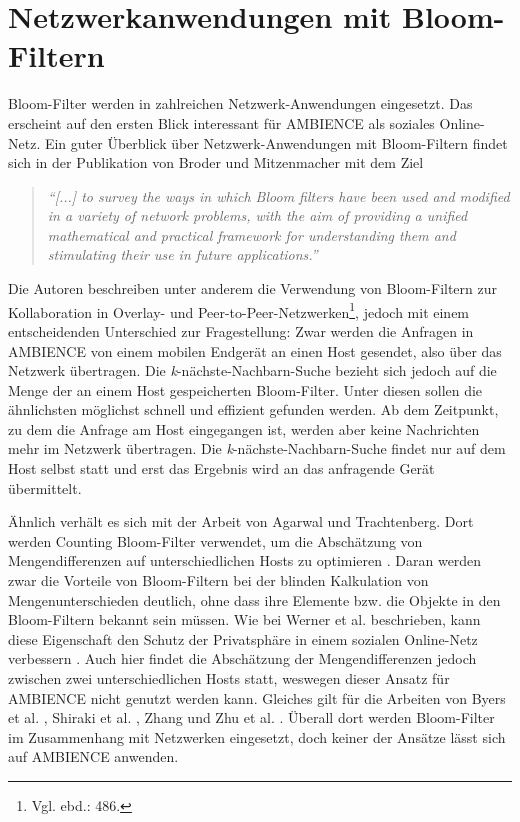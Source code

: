 \section{Netzwerkanwendungen mit Bloom-Filtern}\label{sec:bloom-netzwerk}
Bloom-Filter werden in zahlreichen Netzwerk-Anwendungen eingesetzt. Das erscheint auf den ersten Blick interessant für AMBIENCE als soziales Online-Netz. Ein guter Überblick über Netzwerk-Anwendungen mit Bloom-Filtern findet sich in der Publikation von Broder und Mitzenmacher mit dem Ziel 
\begin{quote}
\textit{"`[...] to survey the ways in which Bloom filters have been used and modified in a variety of network problems, with the aim of providing a unified mathematical and practical framework for understanding them and stimulating their use in future applications."'} \cite{Broder2004}
\end{quote}
Die Autoren beschreiben unter anderem die Verwendung von Bloom-Filtern zur Kollaboration in Overlay- und Peer-to-Peer-Netzwerken\footnote{Vgl. ebd.: 486.}, jedoch mit einem entscheidenden Unterschied zur Fragestellung: Zwar werden die Anfragen in AMBIENCE von einem mobilen Endgerät an einen Host gesendet, also über das Netzwerk übertragen. Die \textit{k}-nächste-Nachbarn-Suche bezieht sich jedoch auf die Menge der an einem Host gespeicherten Bloom-Filter. Unter diesen sollen die ähnlichsten möglichst schnell und effizient gefunden werden. Ab dem Zeitpunkt, zu dem die Anfrage am Host eingegangen ist, werden aber keine Nachrichten mehr im Netzwerk übertragen. Die \textit{k}-nächste-Nachbarn-Suche findet nur auf dem Host selbst statt und erst das Ergebnis wird an das anfragende Gerät übermittelt. 

Ähnlich verhält es sich mit der Arbeit von Agarwal und Trachtenberg. Dort werden Counting Bloom-Filter verwendet, um die Abschätzung von Mengendifferenzen auf unterschiedlichen Hosts zu optimieren \cite{Agarwal2006}. Daran werden zwar die Vorteile von Bloom-Filtern bei der blinden Kalkulation von Mengenunterschieden deutlich, ohne dass ihre Elemente bzw. die Objekte in den Bloom-Filtern bekannt sein müssen. Wie bei Werner et al. beschrieben, kann diese Eigenschaft den Schutz der Privatsphäre in einem sozialen Online-Netz verbessern \cite{Werner2015}. Auch hier findet die Abschätzung der Mengendifferenzen jedoch zwischen zwei unterschiedlichen Hosts statt, weswegen dieser Ansatz für AMBIENCE nicht genutzt werden kann. Gleiches gilt für die Arbeiten von Byers et al. \cite{Byers2002}, Shiraki et al. \cite{Shiraki2009}, Zhang \cite{Zhang2012} und Zhu et al. \cite{Zhu2004}. Überall dort werden Bloom-Filter im Zusammenhang mit Netzwerken eingesetzt, doch keiner der Ansätze lässt sich auf AMBIENCE anwenden. 

